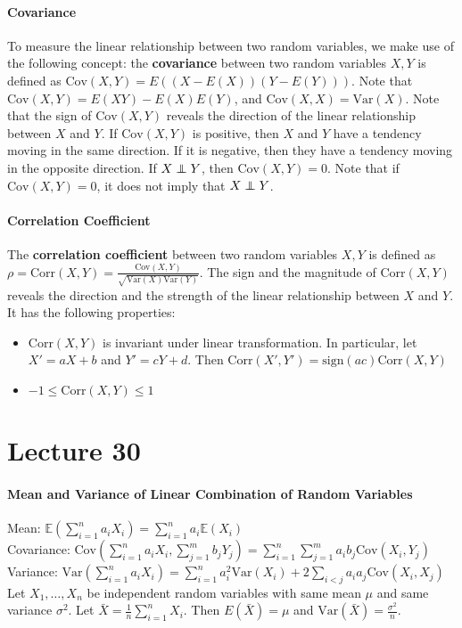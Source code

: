 \documentclass[10pt,letter]{article}
\newcommand\independent{\protect\mathpalette{\protect\independenT}{\perp}}
\def\independenT#1#2{\mathrel{\rlap{$#1#2$}\mkern2mu{#1#2}}}
\begin{document}
\paragraph{Covariance}
To measure the linear relationship between two random variables, we make use of the following concept: the \textbf{covariance} between two random variables $X,Y$ is defined as $\text{Cov}(X,Y)=E((X-E(X))(Y-E(Y)))$. Note that $\text{Cov}(X,Y)=E(XY)-E(X)E(Y)$, and $\text{Cov}(X,X)=\text{Var}(X)$. Note that the sign of $\text{Cov}(X,Y)$ reveals the direction of the linear relationship between $X$ and $Y$. If $\text{Cov}(X,Y)$ is positive, then $X$ and $Y$ have a tendency moving in the same direction. If it is negative, then they have a tendency moving in the opposite direction. If $X\independent Y$, then $\text{Cov}(X,Y)=0$. Note that if $\text{Cov}(X,Y)=0$, it does not imply that $X\independent Y$. 
\paragraph{Correlation Coefficient}
The \textbf{correlation coefficient} between two random variables $X,Y$ is defined as $\rho=\text{Corr}(X,Y)=\frac{\text{Cov}(X,Y)}{\sqrt{\text{Var}(X)\text{Var}(Y)}}$. The sign and the magnitude of $\text{Corr}(X,Y)$ reveals the direction and the strength of the linear relationship between $X$ and $Y$. It has the following properties: 
\begin{itemize}
    \item $\text{Corr}(X,Y)$ is invariant under linear transformation. In particular, let $X'=aX+b$ and $Y'=cY+d$. Then $\text{Corr}(X',Y')=\text{sign}(ac)\text{Corr}(X,Y)$ 
    \item $-1\leq\text{Corr}(X,Y)\leq1$ 
\end{itemize}

\section*{Lecture 30}
\paragraph{Mean and Variance of Linear Combination of Random Variables}
Mean: $\mathbb{E}\left(\sum_{i=1}^na_iX_i\right)=\sum_{i=1}^na_i\mathbb{E}(X_i)$\\ 
Covariance: $\text{Cov}\left(\sum_{i=1}^na_iX_i,\sum_{j=1}^mb_jY_j\right)=\sum_{i=1}^n\sum_{j=1}^ma_ib_j\text{Cov}(X_i,Y_j)$ \\ 
Variance: $\text{Var}(\sum_{i=1}^na_iX_i)=\sum_{i=1}^na_i^2\text{Var}(X_i)+2\sum_{i<j}a_ia_j\text{Cov}(X_i,X_j)$ \\ 
Let $X_1,\ldots,X_n$ be independent random variables with same mean $\mu$ and same variance $\sigma^2$. Let $\bar{X}=\frac{1}{n}\sum_{i=1}^nX_i$. Then $E(\bar{X})=\mu$ and $\text{Var}(\bar{X})=\frac{\sigma^2}{n}$. 
\end{document}
